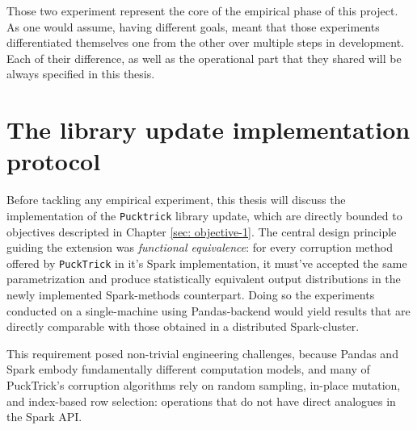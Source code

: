 \documentclass[../main.tex]{subfiles}
\begin{document}
Those two experiment represent the core of the empirical phase of this project. As one would assume, having different goals, meant that those experiments differentiated themselves one from the other over multiple steps in development. Each of their difference, as well as the operational part that they shared will be always specified in this thesis. 


\newpage
\section{The library update implementation protocol}
Before tackling any empirical experiment, this thesis will discuss the implementation of the \texttt{Pucktrick} library update, which are directly bounded to objectives descripted in Chapter \ref{sec: objective-1}. The central design principle guiding the extension was \emph{functional equivalence}: for every corruption method offered by \texttt{PuckTrick} in it's Spark implementation, it must've accepted the same parametrization and produce statistically equivalent output distributions in the newly implemented Spark-methods counterpart. Doing so the experiments conducted on a single-machine using Pandas-backend would yield results that are directly comparable with those obtained in a distributed Spark-cluster.  

This requirement posed non-trivial engineering challenges, because Pandas and Spark embody fundamentally different computation models, and many of PuckTrick's corruption algorithms rely on random sampling, in-place mutation, and index-based row selection: operations that do not have direct analogues in the Spark API.
\end{document}
